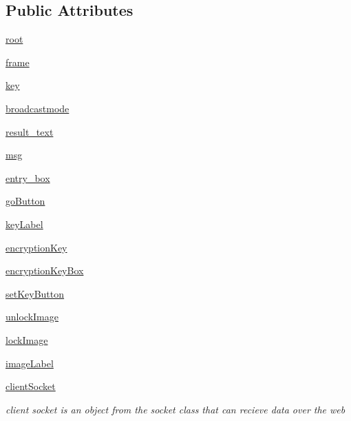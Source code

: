 \subsection*{Public Attributes}
\begin{DoxyCompactItemize}
\item 
\hyperlink{classgui_version_1_1_chat_client_g_u_i_afec7497b20c1d133c5c026c9625a1691}{root}
\item 
\hyperlink{classgui_version_1_1_chat_client_g_u_i_a7809572437bc7888072cb612990da273}{frame}
\item 
\hyperlink{classgui_version_1_1_chat_client_g_u_i_afe7983bc0c4a2f71030e992caca57b43}{key}
\item 
\hyperlink{classgui_version_1_1_chat_client_g_u_i_a24c3049b3a6f498d56685eef5405baf6}{broadcastmode}
\item 
\hyperlink{classgui_version_1_1_chat_client_g_u_i_aed7ce16822dd2da856987bb7dbca00f7}{result\+\_\+text}
\item 
\hyperlink{classgui_version_1_1_chat_client_g_u_i_a44a52021282a7dc6c04aa10b77d829e9}{msg}
\item 
\hyperlink{classgui_version_1_1_chat_client_g_u_i_a4436c621e5f3c806218c2756edf488f7}{entry\+\_\+box}
\item 
\hyperlink{classgui_version_1_1_chat_client_g_u_i_a5a09ecaf8a2c39309f7b7acdea272bc5}{go\+Button}
\item 
\hyperlink{classgui_version_1_1_chat_client_g_u_i_a5af88dbf7d3768e3b2b3d085c4560345}{key\+Label}
\item 
\hyperlink{classgui_version_1_1_chat_client_g_u_i_aafa39a201580f18372e0911d9667ccbd}{encryption\+Key}
\item 
\hyperlink{classgui_version_1_1_chat_client_g_u_i_a61e070d785a0e8308bf1a26788075258}{encryption\+Key\+Box}
\item 
\hyperlink{classgui_version_1_1_chat_client_g_u_i_a6f8fa5385bc6fa43fe07f02151b54dac}{set\+Key\+Button}
\item 
\hyperlink{classgui_version_1_1_chat_client_g_u_i_ac9bcddaa82b6d786fa50638f18fd814b}{unlock\+Image}
\item 
\hyperlink{classgui_version_1_1_chat_client_g_u_i_af4e157319d9a46549b533d5718e8d114}{lock\+Image}
\item 
\hyperlink{classgui_version_1_1_chat_client_g_u_i_adc513d1ee47a0582c35cc426cd582f1d}{image\+Label}
\item 
\hyperlink{classgui_version_1_1_chat_client_g_u_i_ad0d119fff1856994d498e1e9861451d5}{client\+Socket}
\begin{DoxyCompactList}\small\item\em client socket is an object from the socket class that can recieve data over the web \end{DoxyCompactList}\end{DoxyCompactItemize}


